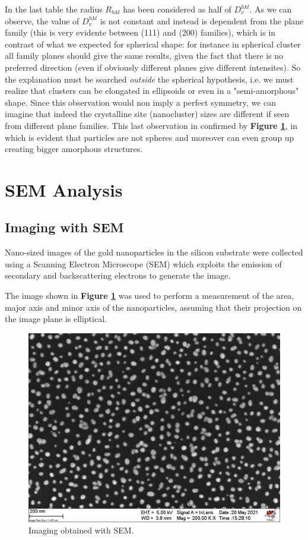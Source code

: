 \documentclass[twocolumn]{article}
\begin{document}
\begin{multicols}{2}
In the last table the radius $R_{hkl}$ has been considered as half of $D_v^{hkl}$. As we can observe, the value of $D_v^{hkl}$ is not constant and instead is dependent from the plane family (this is very evidente between (111) and (200) families), which is in contrast of what we expected for spherical shape: for instance in spherical cluster all family planes should give the same results, given the fact that there is no preferred direction (even if obviously different planes give different intensites). So the explanation must be searched {\it outside} the spherical hypothesis, i.e. we must realize that clusters can be elongated in ellipsoids or even in a "semi-amorphous" shape. Since this observation would non imply a perfect symmetry, we can imagine that indeed the crystalline site (nanocluster) sizes are different if seen from different plane families.  
This last observation in confirmed by {\bf Figure \ref{fig:semss}}, in which is evident that particles are not spheres and moreover can even group up creating bigger amorphous structures. 

\section{SEM Analysis}
\label{sec:SEM}

\subsection{Imaging with SEM}

\noindent
Nano-sized images of the gold nanoparticles in the silicon substrate were collected using a Scanning Electron Microscope (SEM) which exploits the emission of secondary and backscattering electrons to generate the image.

The image shown in \textbf{Figure \ref{fig:semss}} was used to perform a measurement of the area, major axis and minor axis of the nanoparticles, assuming that their projection on the image plane is elliptical.

\begin{figure}[H]
    \centering
    \includegraphics[width=\linewidth]{image/data/imaging.jpg}
    \caption{Imaging obtained with SEM.}
    \label{fig:semss}
\end{figure}


\end{multicols}
\end{document}
